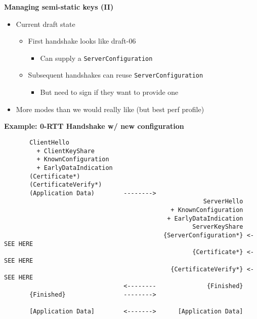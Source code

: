 \documentclass[helvetica]{seminar}
\newcommand{\heading}[1]{%
  \begin{center} 
    \large\bf 
    #1 
  \end{center} 
  \vspace{.4 in}}
\begin{document}
\begin{slide}
\heading{Managing semi-static keys (II)}
\begin{itemize}
\item Current draft state
  \begin{itemize}
  \item First handshake looks like draft-06
    \begin{itemize}
    \item Can supply a \verb^ServerConfiguration^
    \end{itemize}

  \item Subsequent handshakes can reuse \verb^ServerConfiguration^
    \begin{itemize}
      \item But need to sign if they want to provide one
    \end{itemize}
  \end{itemize}
\item More modes than we would really like (but best perf profile)
\end{itemize}
\end{slide}


\begin{slide}
\heading{Example: 0-RTT Handshake w/ new configuration}

\vspace{-4ex}
\begin{footnotesize}
\begin{verbatim}
       ClientHello
         + ClientKeyShare
         + KnownConfiguration
         + EarlyDataIndication
       (Certificate*)
       (CertificateVerify*)
       (Application Data)        -------->
                                                       ServerHello
                                              + KnownConfiguration
                                             + EarlyDataIndication
                                                    ServerKeyShare
                                            {ServerConfiguration*} <- SEE HERE
                                                    {Certificate*} <- SEE HERE
                                              {CertificateVerify*} <- SEE HERE
                                 <--------              {Finished}
       {Finished}                -------->

       [Application Data]        <------->      [Application Data]
\end{verbatim}
\end{footnotesize}
\end{slide}
\end{document}
